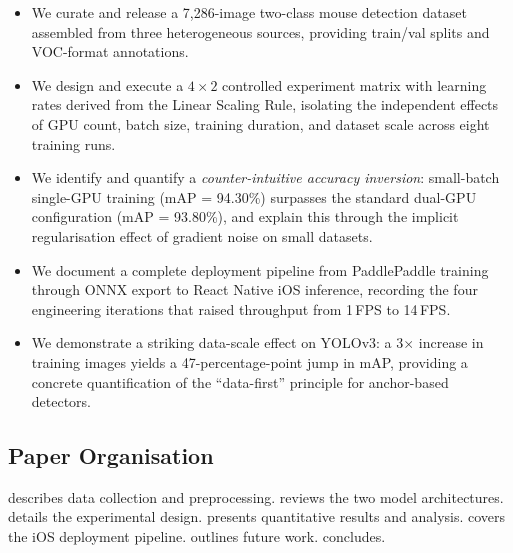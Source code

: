\begin{itemize}[leftmargin=1.5em]
  \item We curate and release a 7,286-image two-class mouse detection
    dataset assembled from three heterogeneous sources, providing train/val
    splits and VOC-format annotations.

  \item We design and execute a $4\!\times\!2$ controlled experiment matrix
    with learning rates derived from the Linear Scaling Rule, isolating the
    independent effects of GPU count, batch size, training duration, and
    dataset scale across eight training runs.

  \item We identify and quantify a \emph{counter-intuitive accuracy
    inversion}: small-batch single-GPU training (mAP = 94.30\%) surpasses
    the standard dual-GPU configuration (mAP = 93.80\%), and explain this
    through the implicit regularisation effect of gradient noise on
    small datasets.

  \item We document a complete deployment pipeline from PaddlePaddle
    training through ONNX export to React Native iOS inference, recording
    the four engineering iterations that raised throughput from 1\,FPS to
    14\,FPS.

  \item We demonstrate a striking data-scale effect on YOLOv3:
    a 3$\times$ increase in training images yields a 47-percentage-point
    jump in mAP, providing a concrete quantification of the
    ``data-first'' principle for anchor-based detectors.
\end{itemize}

\subsection*{Paper Organisation}

 describes data collection and preprocessing.
 reviews the two model architectures.
 details the experimental design.
 presents quantitative results and analysis.
 covers the iOS deployment pipeline.
 outlines future work.
 concludes.
